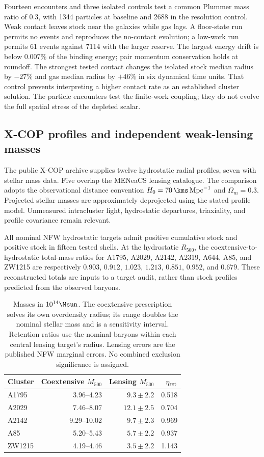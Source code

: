 Fourteen encounters and three isolated controls test a common Plummer
mass ratio of 0.3, with 1344 particles at baseline and 2688 in the
resolution control. Weak contact leaves stock near the galaxies while
gas lags. A floor-state run permits no events and reproduces the
no-contact evolution; a low-work run permits 61 events against 7114
with the larger reserve. The largest energy drift is below 0.007\%
of the binding energy; pair momentum conservation holds at roundoff.
The strongest tested contact changes the isolated stock median radius
by $-27\%$ and gas median radius by $+46\%$ in six dynamical time units.
That control prevents interpreting a higher contact rate as an established
cluster solution. The particle encounters test the finite-work coupling;
they do not evolve the full spatial stress of the depleted scalar.

\subsection{X-COP profiles and independent weak-lensing masses}
The public X-COP archive supplies twelve hydrostatic radial profiles,
seven with stellar mass data. Five overlap the MENeaCS lensing catalogue.
The comparison adopts the observational distance convention
$H_0=70\,\kms\,\mathrm{Mpc}^{-1}$ and $\Omega_m=0.3$.
Projected stellar masses are approximately deprojected using the stated
profile model. Unmeasured intracluster light, hydrostatic departures,
triaxiality, and profile covariance remain relevant.
\cite{xcopnew,herbonnetnew}

All nominal NFW hydrostatic targets admit positive cumulative stock and
positive stock in fifteen tested shells. At the hydrostatic $R_{500}$,
the coextensive-to-hydrostatic total-mass ratios for A1795, A2029, A2142,
A2319, A644, A85, and ZW1215 are respectively
$0.903$, $0.912$, $1.023$, $1.213$, $0.851$, $0.952$, and $0.679$.
These reconstructed totals are inputs to a target audit, rather than
stock profiles predicted from the observed baryons.

\begin{table}[htbp]
\centering\small
\begin{tabular}{lrrr}
\toprule
Cluster & Coextensive $M_{500}$ & Lensing $M_{500}$ & $\eta_{\rm ret}$\\
\midrule
A1795 & 3.96--4.23 & $9.3\pm2.2$ & 0.518\\
A2029 & 7.46--8.07 & $12.1\pm2.5$ & 0.704\\
A2142 & 9.29--10.02 & $9.7\pm2.3$ & 0.969\\
A85 & 5.20--5.43 & $5.7\pm2.2$ & 0.937\\
ZW1215 & 4.19--4.46 & $3.5\pm2.2$ & 1.143\\
\bottomrule
\end{tabular}
\caption{Masses in $10^{14}\Msun$. The coextensive prescription solves
its own overdensity radius; its range doubles the nominal stellar mass
and is a sensitivity interval. Retention ratios use the nominal baryons
within each central lensing target's radius. Lensing errors are the
published NFW marginal errors. No combined exclusion significance is
assigned.}
\end{table}

